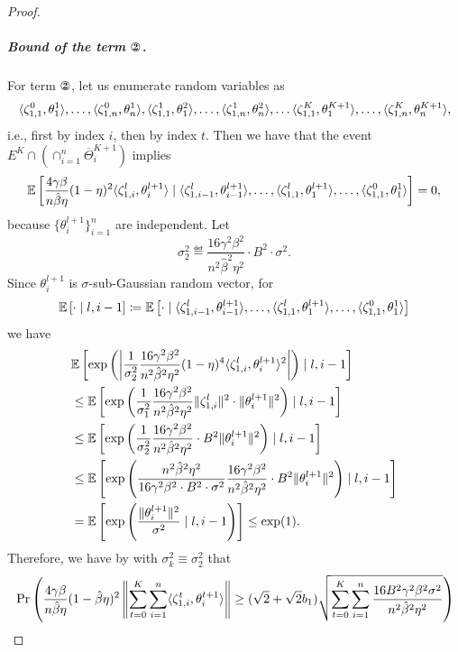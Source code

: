 \documentclass[a4paper,11pt]{article}
\begin{document}
\begin{proof}
    
    \subparagraph{Bound of the term $\circledTwo$.} For term $\circledTwo$, let us enumerate random variables as 
    \[
    \<\zeta_{1,1}^0,\theta^1_1>, \dots, \<\zeta_{1,n}^0,\theta^1_n>, \<\zeta_{1,1}^1,\theta^2_1>,\dots, \<\zeta_{1,n}^1,\theta^2_n>, \dots 
    \<\zeta_{1,1}^K,\theta^{K+1}_1>,\dots,
    \<\zeta_{1,n}^K,\theta^{K+1}_n>,
    \]
    i.e., first by index $i$, then by index $t$. Then we have that the event $E^K\cap \left(\cap_{i=1}^n\overline{\Theta}^{K+1}_i\right)$ implies 
    \[
    \E{\frac{4\gamma\beta}{n\hat{\beta}\eta}(1-\eta)^2\<\zeta^l_{1,i},\theta^{l+1}_i>\mid  \<\zeta_{1,i-1}^l,\theta^{l+1}_{i-1}>, \dots, \<\zeta_{1,1}^l,\theta^{l+1}_{1}>, \dots, \<\zeta_{1,1}^{0},\theta^{1}_{1}>} = 0,
    \]
    because $\{\theta^{l+1}_i\}_{i=1}^n$ are independent. Let 
    \[
    \sigma_{2}^2 \eqdef \frac{16\gamma^2\beta^2}{n^2\hat{\beta}^2\eta^2}\cdot B^2 \cdot \sigma^2.
    \]
    Since $\theta^{l+1}_i$ is $\sigma$-sub-Gaussian random vector, for $$\E{\cdot \mid l,i-1} \eqdef \E{ \cdot \mid  \<\zeta_{1,i-1}^l,\theta^{l+1}_{i-1}>, \dots, \<\zeta_{1,1}^l,\theta^{l+1}_{1}>, \dots, \<\zeta_{1,1}^{0},\theta^{1}_{1}>}$$ we have
    \begin{align*}
    &\E{\exp\left(\left|\frac{1}{\sigma_2^2}\frac{16\gamma^2\beta^2}{n^2\hat{\beta}^2\eta^2}(1-\eta)^4\<\zeta^l_{1,i},\theta^{l+1}_i>^2\right| \right) \mid l, i-1}\\
    &\le 
    \E{\exp\left(\frac{1}{\sigma^2_1}\frac{16\gamma^2\beta^2}{n^2\hat{\beta}^2\eta^2}\|\zeta_{1,i}^l\|^2 \cdot \|\theta^{l+1}_i\|^2 \right) \mid l,i-1}\\
    &\le \E{\exp\left(\frac{1}{\sigma_2^2}\frac{16\gamma^2\beta^2}{n^2\hat{\beta}^2\eta^2}\cdot B^2\|\theta^{l+1}_i\|^2\right) \mid l, i-1} \\
    &\le \E{\exp\left(\frac{n^2\hat{\beta}^2\eta^2}{16\gamma^2\beta^2\cdot B^2 \cdot \sigma^2}\frac{16\gamma^2\beta^2}{n^2\hat{\beta}^2\eta^2}\cdot B^2\|\theta^{l+1}_i\|^2\right) \mid l, i-1} \\  
    &= \E{\exp\left(\frac{\|\theta^{l+1}_i\|^2}{\sigma^2}\mid l, i-1\right)} \le \exp(1).
    \end{align*}
    Therefore, we have by  with $\sigma_k^2 \equiv \sigma_2^2$ that 
    \begin{align*}
    &\Pr\left(\frac{4\gamma\beta}{n\hat{\beta}\eta}(1-\hat{\beta}\eta)^2\left\|\sum_{t=0}^K\sum_{i=1}^n\<\zeta_{1,i}^t,\theta^{t+1}_i>\right\| 
    \ge (\sqrt{2}+\sqrt{2}b_1)\sqrt{\sum_{t=0}^K\sum_{i=1}^n\frac{16B^2\gamma^2\beta^2\sigma^2}{n^2\hat{\beta}^2\eta^2}}\right) \\

\end{align*}
\end{proof}
\end{document}
